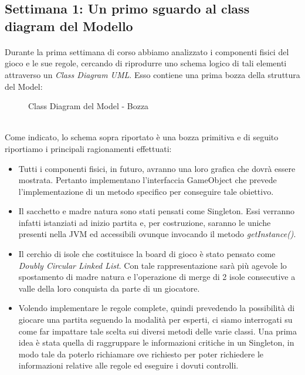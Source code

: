 \documentclass[a4paper, 12pt]{article}
\begin{document}
	\subsection{Settimana 1: Un primo sguardo al class diagram del Modello}
	\paragraph{}
	Durante la prima settimana di corso abbiamo analizzato i componenti fisici del gioco e le sue regole, cercando di riprodurre uno schema logico di tali elementi attraverso un \emph{Class Diagram UML}. Esso contiene una prima bozza della struttura del Model:\\
	\begin{figure}[h]
		\centering
		\def\svgwidth{\columnwidth}
		\resizebox{\linewidth}{!}{}
		\caption{Class Diagram del Model - Bozza}
	\end{figure}\\
	Come indicato, lo schema sopra riportato è una bozza primitiva e di seguito riportiamo i principali ragionamenti effettuati:\\
	\begin{itemize}
		\setlength{\parskip}{0pt}
		\setlength{\parsep}{0pt}
		
		\item Tutti i componenti fisici, in futuro, avranno una loro grafica che dovrà essere mostrata. Pertanto implementano l'interfaccia GameObject che prevede l'implementazione di un metodo specifico per conseguire tale obiettivo.
		\item Il sacchetto e madre natura sono stati pensati come Singleton. Essi verranno infatti istanziati ad inizio partita e, per costruzione, saranno le uniche presenti nella JVM ed accessibili ovunque invocando il metodo \emph{getInstance()}.
		\item Il cerchio di isole che costituisce la board di gioco è stato pensato come \emph{Doubly Circular Linked List}\cite{circularDoublyLinkedList}. Con tale rappresentazione sarà più agevole lo spostamento di madre natura e l'operazione di merge di 2 isole consecutive a valle della loro conquista da parte di un giocatore.
		\item Volendo implementare le regole complete, quindi prevedendo la possibilità di giocare una partita seguendo la modalità per esperti, ci siamo interrogati su come far impattare tale scelta sui diversi metodi delle varie classi. Una prima idea è stata quella di raggruppare le informazioni critiche in un Singleton, in modo tale da poterlo richiamare ove richiesto per poter richiedere le informazioni relative alle regole ed eseguire i dovuti controlli.
	\end{itemize}
	
\end{document}
